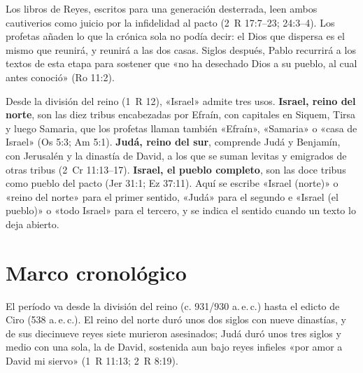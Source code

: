 \documentclass[11pt,letterpaper]{article}
\begin{document}
Los libros de Reyes, escritos para una generación desterrada, leen ambos cautiverios como juicio por la infidelidad al pacto (2~R 17:7--23; 24:3--4). Los profetas añaden lo que la crónica sola no podía decir: el Dios que dispersa es el mismo que reunirá, y reunirá a las dos casas. Siglos después, Pablo recurrirá a los textos de esta etapa para sostener que «no ha desechado Dios a su pueblo, al cual antes conoció» (Ro 11:2).

\begin{nota}
Desde la división del reino (1~R 12), «Israel» admite tres usos. \textbf{Israel, reino del norte}, son las diez tribus encabezadas por Efraín, con capitales en Siquem, Tirsa y luego Samaria, que los profetas llaman también «Efraín», «Samaria» o «casa de Israel» (Os 5:3; Am 5:1). \textbf{Judá, reino del sur}, comprende Judá y Benjamín, con Jerusalén y la dinastía de David, a los que se suman levitas y emigrados de otras tribus (2~Cr 11:13--17). \textbf{Israel, el pueblo completo}, son las doce tribus como pueblo del pacto (Jer 31:1; Ez 37:11). Aquí se escribe «Israel (norte)» o «reino del norte» para el primer sentido, «Judá» para el segundo e «Israel (el pueblo)» o «todo Israel» para el tercero, y se indica el sentido cuando un texto lo deja abierto.
\end{nota}


\section{Marco cronológico}

El período va desde la división del reino (c. 931/930 a.\,e.\,c.) hasta el edicto de Ciro (538 a.\,e.\,c.). El reino del norte duró unos dos siglos con nueve dinastías, y de sus diecinueve reyes siete murieron asesinados; Judá duró unos tres siglos y medio con una sola, la de David, sostenida aun bajo reyes infieles «por amor a David mi siervo» (1~R 11:13; 2~R 8:19).
\end{document}
